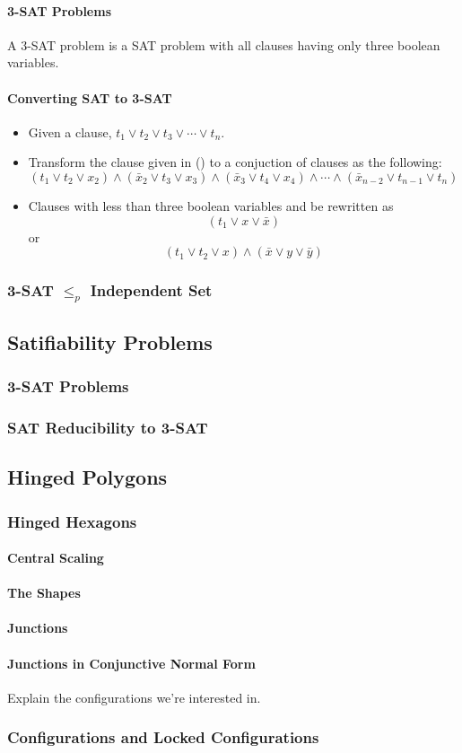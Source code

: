 \paragraph{3-SAT Problems}
A 3-SAT problem is a SAT problem with all clauses having only three boolean variables. 
\paragraph{Converting SAT to 3-SAT}
\begin{itemize}
\item[\rn{1}] Given a clause, $t_1 \vee t_2 \vee t_3 \vee \cdots \vee t_n$.
\item[\rn{2}] Transform the clause given in () to a conjuction of clauses as the following:
$$\left( t_1 \vee t_2 \vee x_2 \right)\wedge\left( \bar{x}_2 \vee t_3 \vee x_3 \right)\wedge\left( \bar{x}_3 \vee t_4 \vee x_4 \right)\wedge \cdots \wedge \left( \bar{x}_{n-2} \vee t_{n-1} \vee t_n \right)$$
\item[\rn{3}] Clauses with less than three boolean variables and be rewritten as $$\left( t_1 \vee x \vee \bar{x} \right) $$ or $$\left( t_1 \vee t_2 \vee x \right)\wedge \left( \bar{x}  \vee y \vee \bar{y} \right)$$
\end{itemize}  
\subsubsection{3-SAT $\leq_p $ Independent Set}


\subsection{Satifiability Problems}
\subsubsection{3-SAT Problems}
\subsubsection{SAT Reducibility to 3-SAT}
\subsection{Hinged Polygons}
\subsubsection{Hinged Hexagons}
\paragraph{Central Scaling}
\paragraph{The Shapes}
\paragraph{Junctions}
\paragraph{Junctions in Conjunctive Normal Form}
Explain the configurations we're interested in.
\subsubsection{Configurations and Locked Configurations}